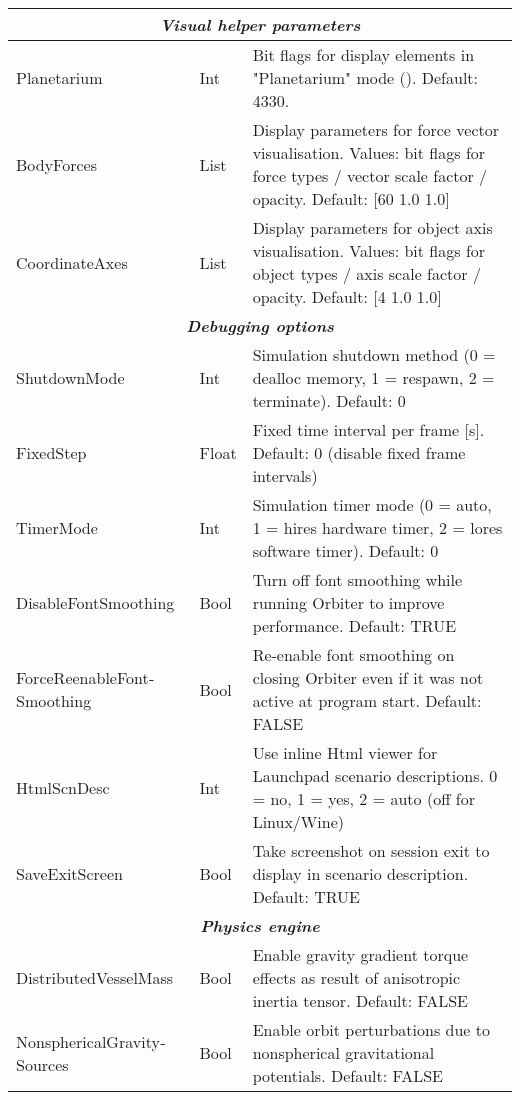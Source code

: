 \documentclass[Orbiter Developer Manual.tex]{subfiles}
\begin{document}
\begin{longtable}{ |p{}|p{}|p{}| }
	\hline
	\multicolumn{3}{|c|}{\rule{0pt}{2ex}\textbf{\textit{Visual helper parameters}}}\\
	\hline\rule{0pt}{2ex}
	Planetarium & Int & Bit flags for display elements in "Planetarium" mode (\keystroke{F9}). Default: 4330.\\
	\hline\rule{0pt}{2ex}
	BodyForces & List & Display parameters for force vector visualisation. Values: bit flags for force types / vector scale factor / opacity. Default: [60 1.0 1.0]\\
	\hline\rule{0pt}{2ex}
	CoordinateAxes & List & Display parameters for object axis visualisation. Values: bit flags for object types / axis scale factor / opacity. Default: [4 1.0 1.0]\\
	\hline
	\multicolumn{3}{|c|}{\rule{0pt}{2ex}\textbf{\textit{Debugging options}}}\\
	\hline\rule{0pt}{2ex}
	ShutdownMode & Int & Simulation shutdown method (0 = dealloc memory, 1 = respawn, 2 = terminate). Default: 0\\
	\hline\rule{0pt}{2ex}
	FixedStep & Float & Fixed time interval per frame [s]. Default: 0 (disable fixed frame intervals)\\
	\hline\rule{0pt}{2ex}
	TimerMode & Int & Simulation timer mode (0 = auto, 1 = hires hardware timer, 2 = lores software timer). Default: 0\\
	\hline\rule{0pt}{2ex}
	DisableFontSmoothing & Bool & Turn off font smoothing while running Orbiter to improve performance. Default: TRUE\\
	\hline\rule{0pt}{2ex}
	ForceReenableFont­Smoothing & Bool & Re-enable font smoothing on closing Orbiter even if it was not active at program start. Default: FALSE\\
	\hline\rule{0pt}{2ex}
	HtmlScnDesc & Int & Use inline Html viewer for Launchpad scenario descriptions. 0 = no, 1 = yes, 2 = auto (off for Linux/Wine)\\
	\hline\rule{0pt}{2ex}
	SaveExitScreen & Bool & Take screenshot on session exit to display in scenario description. Default: TRUE\\
	\hline
	\multicolumn{3}{|c|}{\rule{0pt}{2ex}\textbf{\textit{Physics engine}}}\\
	\hline\rule{0pt}{2ex}
	DistributedVesselMass & Bool & Enable gravity gradient torque effects as result of anisotropic inertia tensor. Default: FALSE\\
	\hline\rule{0pt}{2ex}
	NonsphericalGravity­Sources & Bool & Enable orbit perturbations due to nonspherical gravitational potentials. Default: FALSE\\

\end{longtable}
\end{document}
